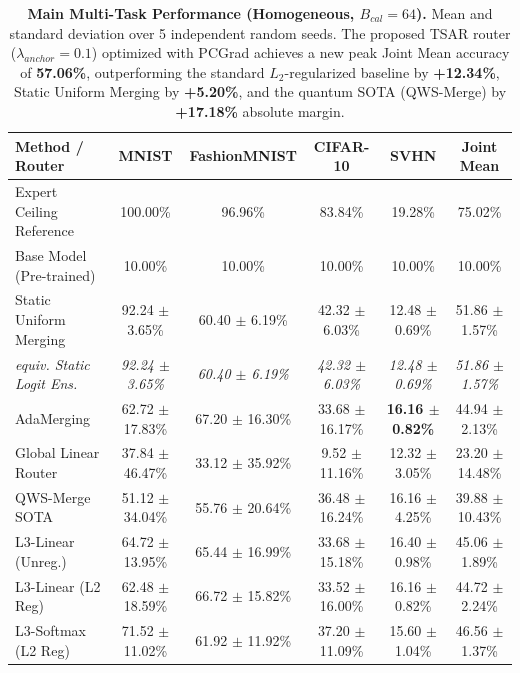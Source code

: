 \begin{table}[t]
\caption{\textbf{Main Multi-Task Performance (Homogeneous, $B_{cal}=64$).} Mean and standard deviation over 5 independent random seeds. The proposed TSAR router ($\lambda_{anchor}=0.1$) optimized with PCGrad achieves a new peak Joint Mean accuracy of \textbf{57.06\%}, outperforming the standard $L_2$-regularized baseline by \textbf{+12.34\%}, Static Uniform Merging by \textbf{+5.20\%}, and the quantum SOTA (QWS-Merge) by \textbf{+17.18\%} absolute margin.}
\label{tab:main_results}
\vskip 0.15in
\begin{center}
\begin{small}
\begin{sc}
\setlength{\tabcolsep}{4pt}
\begin{tabular}{lccccc}
\toprule
Method / Router & MNIST & FashionMNIST & CIFAR-10 & SVHN & Joint Mean \\
\midrule
Expert Ceiling Reference & 100.00\% & 96.96\% & 83.84\% & 19.28\% & 75.02\% \\
Base Model (Pre-trained) & 10.00\% & 10.00\% & 10.00\% & 10.00\% & 10.00\% \\
\midrule
Static Uniform Merging & 92.24 $\pm$ 3.65\% & 60.40 $\pm$ 6.19\% & 42.32 $\pm$ 6.03\% & 12.48 $\pm$
0.69\% & 51.86 $\pm$ 1.57\% \\
\quad \textit{equiv. Static Logit Ens.} & \textit{92.24 $\pm$ 3.65\%} & \textit{60.40 $\pm$ 6.19\%} & \textit{42.32 $\pm$ 6.03\%} & \textit{12.48 $\pm$ 0.69\%} & \textit{51.86 $\pm$ 1.57\%} \\
AdaMerging \cite{yang2023adamerging} & 62.72 $\pm$ 17.83\% & 67.20 $\pm$ 16.30\% & 33.68 $\pm$
16.17\% & \textbf{16.16 $\pm$ 0.82\%} & 44.94 $\pm$ 2.13\% \\
Global Linear Router & 37.84 $\pm$ 46.47\% & 33.12 $\pm$ 35.92\% & 9.52 $\pm$ 11.16\% & 12.32 $\pm$
3.05\% & 23.20 $\pm$ 14.48\% \\
QWS-Merge SOTA & 51.12 $\pm$ 34.04\% & 55.76 $\pm$ 20.64\% & 36.48 $\pm$ 16.24\% & 16.16 $\pm$
4.25\% & 39.88 $\pm$ 10.43\% \\
L3-Linear (Unreg.) & 64.72 $\pm$ 13.95\% & 65.44 $\pm$ 16.99\% & 33.68 $\pm$ 15.18\% & 16.40 $\pm$
0.98\% & 45.06 $\pm$ 1.89\% \\
L3-Linear (L2 Reg) & 62.48 $\pm$ 18.59\% & 66.72 $\pm$ 15.82\% & 33.52 $\pm$ 16.00\% & 16.16 $\pm$
0.82\% & 44.72 $\pm$ 2.24\% \\
L3-Softmax (L2 Reg) & 71.52 $\pm$ 11.02\% & 61.92 $\pm$ 11.92\% & 37.20 $\pm$ 11.09\% & 15.60 $\pm$
1.04\% & 46.56 $\pm$ 1.37\% \\

\end{tabular}
\end{sc}
\end{small}
\end{center}
\end{table}
